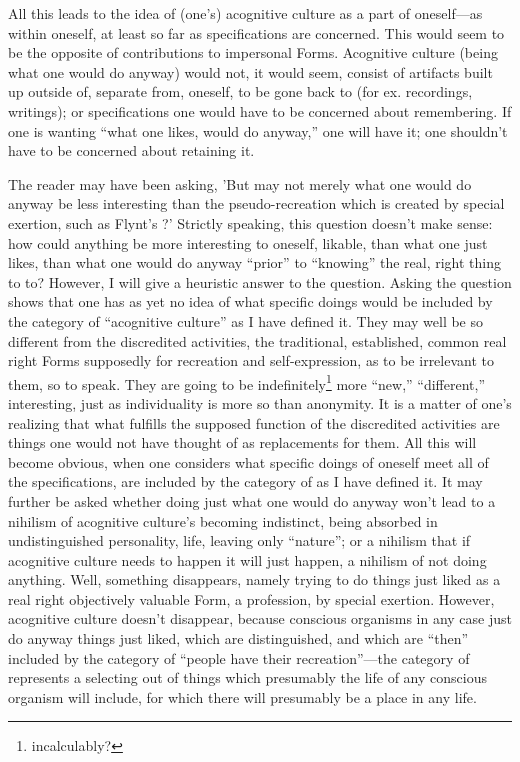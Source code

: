 All this leads to the idea of (one's) acognitive culture as a part of oneself---as within oneself, at least so far as specifications are concerned. This would seem to be the opposite of contributions to impersonal Forms. Acognitive culture (being what one would do anyway) would not, it would seem, consist of artifacts built up outside of, separate from, oneself, to be gone back to (for ex. recordings, writings); or specifications one would have to be concerned about remembering. If one is wanting \enquote{what one likes, would do anyway,} one will have it; one shouldn't have to be concerned about retaining it.

The reader may have been asking, 'But may not merely what one would do anyway be less interesting than the pseudo-recreation which is created by special exertion, such as Flynt's ?' Strictly speaking, this question doesn't make sense: how could anything be more interesting to oneself, likable, than what one just likes, than what one would do anyway \enquote{prior} to \enquote{knowing} the real, right thing to to? However, I will give a heuristic answer to the question. Asking the question shows that one has as yet no idea of what specific doings would be included by the category of \enquote{acognitive culture} as I have defined it. They may well be so different from the discredited activities, the traditional, established, common real right Forms supposedly for recreation and self-expression, as to be irrelevant to them, so to speak. They are going to be indefinitely\footnote{incalculably?} more \enquote{new,} \enquote{different,} interesting, just as individuality is more so than anonymity. It is a matter of one's realizing that what fulfills the supposed function of the discredited activities are things one would not have thought of as replacements for them. All this will become obvious, when one considers what specific doings of oneself meet all of the specifications, are included by the category of  as I have defined it. It may further be asked whether doing just what one would do anyway won't lead to a nihilism of acognitive culture's becoming indistinct, being absorbed in undistinguished personality, life, leaving only \enquote{nature}; or a nihilism that if acognitive culture needs to happen it will just happen, a nihilism of not doing anything. Well, something disappears, namely trying to do things just liked as a real right objectively valuable Form, a profession, by special exertion. However, acognitive culture doesn't disappear, because conscious organisms in any case just do anyway things just liked, which are distinguished, and which are \enquote{then} included by the category of  \enquote{people have their recreation}---the category of  represents a selecting out of things which presumably the life of any conscious organism will include, for which there will presumably be a place in any life.

